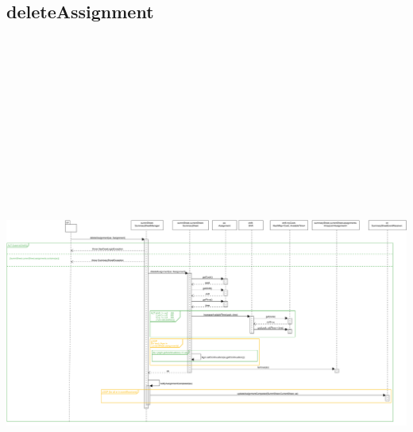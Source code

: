 \subsection{deleteAssignment}
\centering\includegraphics[max width=\textwidth, max height=190mm]{../resources/img/GCC/DSD/op5b.png}